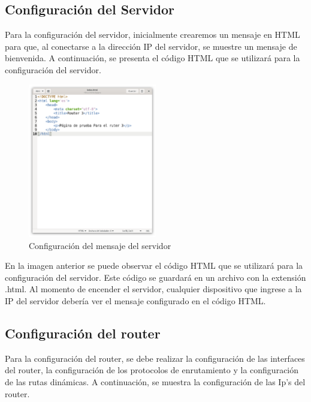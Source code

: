     \subsection{Configuración del Servidor}
    Para la configuración del servidor, inicialmente crearemos un mensaje en HTML para que, al conectarse a la dirección IP del servidor, se muestre un mensaje de bienvenida. A continuación, se presenta el código HTML que se utilizará para la configuración del servidor.
        \begin{figure}[H]
            \centering
            \includegraphics[width=0.5\textwidth]{img/codigo.png}
            \caption{Configuración del mensaje del servidor}
            \label{fig:serverCodigo}
        \end{figure}
        En la imagen anterior se puede observar el código HTML que se utilizará para la configuración del servidor. Este código se guardará en un archivo con la extensión .html. Al momento de encender el servidor, cualquier dispositivo que ingrese a la IP del servidor debería ver el mensaje configurado en el código HTML.

    \subsection{Configuración del router}
        Para la configuración del router, se debe realizar la configuración de las interfaces del router, la configuración de los protocolos de enrutamiento y la configuración de las rutas dinámicas. A continuación, se muestra la configuración de las Ip's del router.

